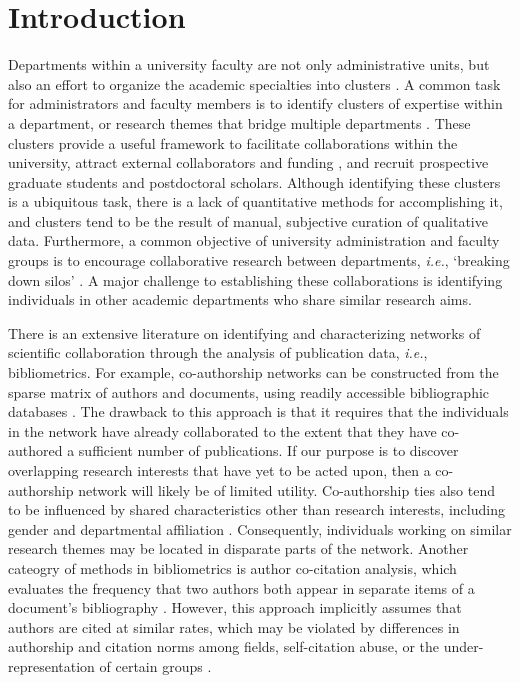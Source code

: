 \documentclass[12pt]{article}
\begin{document}
\clearpage

\section * {Introduction}

Departments within a university faculty are not only administrative units, but also an effort to organize the academic specialties into clusters \citep{dressel1970university}.
A common task for administrators and faculty members is to identify clusters of expertise within a department, or research themes that bridge multiple departments \citep{demes2019catalyzing}.
These clusters provide a useful framework to facilitate collaborations within the university, attract external collaborators and funding \citep{qi2022choosing}, and recruit prospective graduate students and postdoctoral scholars.
Although identifying these clusters is a ubiquitous task, there is a lack of quantitative methods for accomplishing it, and clusters tend to be the result of manual, subjective curation of qualitative data.
Furthermore, a common objective of university administration and faculty groups is to encourage collaborative research between departments, \textit{i.e.}, `breaking down silos' \citep{luke2015breaking}.
A major challenge to establishing these collaborations is identifying individuals in other academic departments who share similar research aims.



There is an extensive literature on identifying and characterizing networks of scientific collaboration through the analysis of publication data, \textit{i.e.}, bibliometrics.
For example, co-authorship networks can be constructed from the sparse matrix of authors and documents, using readily accessible bibliographic databases \citep{fagan2018assessing}.
The drawback to this approach is that it requires that the individuals in the network have already collaborated to the extent that they have co-authored a sufficient number of publications.
If our purpose is to discover overlapping research interests that have yet to be acted upon, then a co-authorship network will likely be of limited utility.
Co-authorship ties also tend to be influenced by shared characteristics other than research interests, including gender and departmental affiliation \citep{fagan2018assessing}.
Consequently, individuals working on similar research themes may be located in disparate parts of the network.
Another cateogry of methods in bibliometrics is author co-citation analysis, which evaluates the frequency that two authors both appear in separate items of a document's bibliography \citep{eom2009introduction}.
However, this approach implicitly assumes that authors are cited at similar rates, which may be violated by differences in authorship and citation norms among fields, self-citation abuse, or the under-representation of certain groups \citep{osareh1996bibliometrics}.
\end{document}
